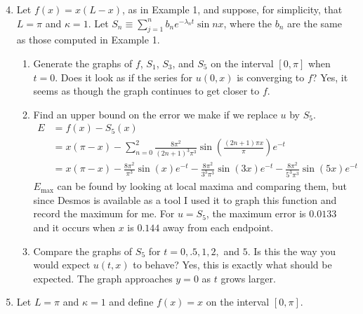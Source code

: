 \documentclass{article}
\begin{document}
\begin{enumerate}
      \setcounter{enumi}{3}
      \item Let $f(x)=x(L-x)$, as in Example 1, and suppose, for simplicity, that
            $L=\pi$ and $\kappa=1$. Let $S_n\equiv \sum_{j=1}^nb_ne^{-\lambda_nt}\sin nx$,
            where the $b_n$ are the same as those computed in Example 1.
            \begin{enumerate}
                  \item Generate the graphs of $f$, $S_1$, $S_3$, and $S_5$ on the interval
                        $[0,\pi]$ when $t=0$. Does it look as if the series for $u(0,x)$ is
                        converging to $f$?
                        \medbreak
                        Yes, it seems as though the graph continues to get closer to $f$.
                  \item Find an upper bound on the error we make if we replace $u$ by $S_5$.
                        \medbreak
                        \begin{align*}
                              E & = f(x)-S_5(x)                                                                                                                     \\
                                & = x(\pi-x) - \sum_{n=0}^{2}\frac{8\pi^{2}}{\left(2n+1\right)^{3}\pi^{3}}\sin\left(\frac{\left(2n+1\right)\pi x}{\pi}\right)e^{-t} \\
                                & = x(\pi-x) - \frac{8\pi^2}{\pi^3}\sin(x)e^{-t} - \frac{8\pi^2}{3^3\pi^3}\sin(3x)e^{-t} - \frac{8\pi^2}{5^3\pi^3}\sin(5x)e^{-t}
                        \end{align*}
                        $E_{\max}$ can be found by looking at local maxima and comparing them,
                        but since Desmos is available as a tool I used it to graph this function
                        and record the maximum for me. For $u=S_5$, the maximum error is $0.0133$
                        and it occurs when $x$ is $0.144$ away from each endpoint.
                  \item Compare the graphs of $S_5$ for $t=0,.5,1,2,$ and $5$. Is this the
                        way you would expect $u(t,x)$ to behave?
                        \medbreak
                        Yes, this is exactly what should be expected. The graph approaches $y=0$
                        as $t$ grows larger.
            \end{enumerate}
      \item Let $L=\pi$ and $\kappa=1$ and define $f(x)=x$ on the interval $[0,\pi]$.

\end{enumerate}
\end{document}
